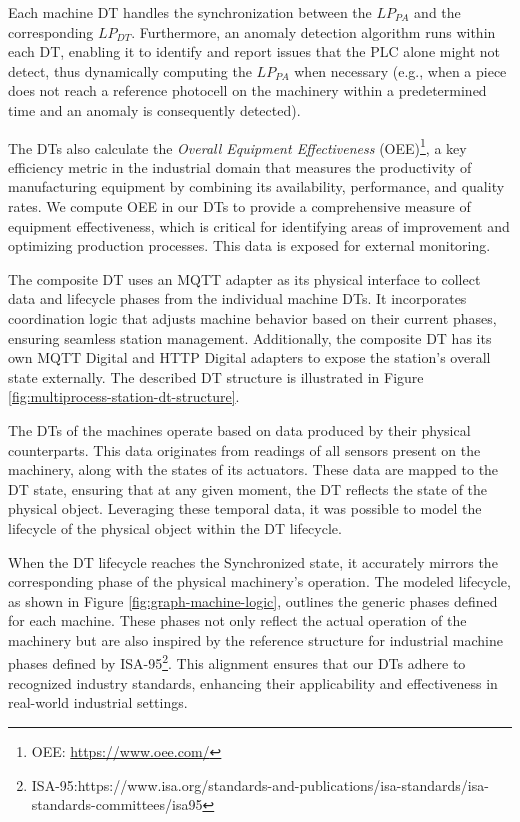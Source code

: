 Each machine DT handles the synchronization between the $LP_{PA}$ and the corresponding $LP_{DT}$. Furthermore, an anomaly detection algorithm runs within each DT, enabling it to identify and report issues that the PLC alone might not detect, thus dynamically computing the $LP_{PA}$ when necessary (e.g., when a piece does not reach a reference photocell on the machinery within a predetermined time and an anomaly is consequently detected).

The DTs also calculate the \textit{Overall Equipment Effectiveness} (OEE)\footnote{OEE: \url{https://www.oee.com/}}, a key efficiency metric in the industrial domain that measures the productivity of manufacturing equipment by combining its availability, performance, and quality rates. We compute OEE in our DTs to provide a comprehensive measure of equipment effectiveness, which is critical for identifying areas of improvement and optimizing production processes. This data is exposed for external monitoring.

The composite DT uses an MQTT adapter as its physical interface to collect data and lifecycle phases from the individual machine DTs. It incorporates coordination logic that adjusts machine behavior based on their current phases, ensuring seamless station management. Additionally, the composite DT has its own MQTT Digital and HTTP Digital adapters to expose the station’s overall state externally. The described DT structure is illustrated in Figure \ref{fig:multiprocess-station-dt-structure}.

The DTs of the machines operate based on data produced by their physical counterparts. This data originates from readings of all sensors present on the machinery, along with the states of its actuators. These data are mapped to the DT state, ensuring that at any given moment, the DT reflects the state of the physical object. Leveraging these temporal data, it was possible to model the lifecycle of the physical object within the DT lifecycle.

When the DT lifecycle reaches the Synchronized state, it accurately mirrors the corresponding phase of the physical machinery's operation. The modeled lifecycle, as shown in Figure \ref{fig:graph-machine-logic}, outlines the generic phases defined for each machine. These phases not only reflect the actual operation of the machinery but are also inspired by the reference structure for industrial machine phases defined by ISA-95\footnote{ISA-95:https://www.isa.org/standards-and-publications/isa-standards/isa-standards-committees/isa95}. This alignment ensures that our DTs adhere to recognized industry standards, enhancing their applicability and effectiveness in real-world industrial settings.


